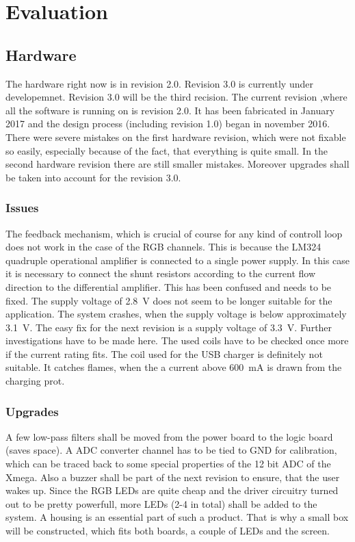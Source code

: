 \chapter{Evaluation}
\label{chap:evaluation}
\section{Hardware}
\label{sec:evaluation_hw}
The hardware right now is in revision 2.0. Revision 3.0 is currently under
developemnet. Revision 3.0 will be the third recision. The current revision
,where all the software is running on is revision 2.0. It has been fabricated in
January 2017 and the design process (including revision 1.0) began in november
2016. There were severe mistakes on the first hardware revision, which were not
fixable so easily, especially because of the fact, that everything is quite
small. In the second hardware revision there are still smaller mistakes.
Moreover upgrades shall be taken into account for the revision 3.0. 

\subsection{Issues}
\label{subsec:issues_hw}
The feedback mechanism, which is crucial of course for any kind of controll loop
does not work in the case of the RGB channels. This is because the LM324
quadruple operational amplifier is connected to a single power supply. In this
case it is necessary to connect the shunt resistors according to the current
flow direction to the differential amplifier. This has been confused and needs
to be fixed. 
\newpar
The supply voltage of \SI{2.8}{\volt} does not seem to be longer suitable for the
application. The system crashes, when the supply voltage is below approximately
\SI{3.1}{\volt}. The easy fix for the next revision is a supply voltage of
\SI{3.3}{V}. Further investigations have to be made here. 
\newpar
The used coils have to be checked once more if the current rating fits. The coil
used for the USB charger is definitely not suitable. It catches flames, when the a current above \SI{600}{\milli\ampere} is drawn from the charging prot. 

\subsection{Upgrades}
\label{subsec:upgrades_hw}
A few low-pass filters shall be moved from the power board to the logic board
(saves space). 
\newpar
A ADC converter channel has to be tied to GND for calibration,
which can be traced back to some special properties of the 12 bit ADC of the
Xmega. 
\newpar
Also a buzzer shall be part of the next revision to ensure, that the user
wakes up.
\newpar
Since the RGB LEDs are quite cheap and the driver circuitry turned
out to be pretty powerfull, more LEDs (2-4 in total) shall be added to the system. 
\newpar
A housing is an essential part of such a product. That is why a small box will
be constructed, which fits both boards, a couple of LEDs and the screen. 

